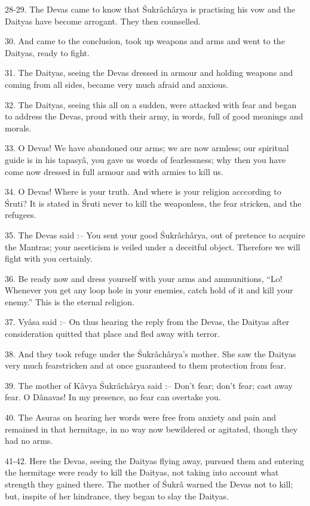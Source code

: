 28-29. The Devas came to know that \'Sukr\^ach\^arya is practising his vow and the Daityas have become arrogant. They then counselled.

30. And came to the conclusion, took up weapons and arms and went to the Daityas, ready to fight.

31. The Daityas, seeing the Devas dressed in armour and holding weapons and coming from all sides, became very much afraid and anxious.

32. The Daityas, seeing this all on a sudden, were attacked with fear and began to address the Devas, proud with their army, in words, full of good meanings and morals.

33. O Devas! We have abandoned our arms; we are now armless; our spiritual guide is in his tapasy\^a, you gave us words of fearlessness; why then you have come now dressed in full armour and with armies to kill us.

34. O Devas! Where is your truth. And where is your religion acccording to \'Sruti? It is stated in \'Sruti never to kill the weaponless, the fear stricken, and the refugees.

35. The Devas said :-- You sent your good \'Sukr\^ach\^arya, out of pretence to acquire the Mantras; your asceticism is veiled under a deceitful object. Therefore we will fight with you certainly.

36. Be ready now and dress yourself with your arms and ammunitions, ``Lo! Whenever you get any loop hole in your enemies, catch hold of it and kill your enemy.'' This is the eternal religion.

37. Vy\^asa said :-- On thus hearing the reply from the Devas, the Daityas after consideration quitted that place and fled away with terror.

38. And they took refuge under the \'Sukr\^ach\^arya's mother. She saw the Daityas very much fearstricken and at once guaranteed to them protection from fear.

39. The mother of K\^avya \'Sukr\^ach\^arya said :-- Don't fear; don't fear; cast away fear. O D\^anavas! In my presence, no fear can overtake you.

40. The Asuras on hearing her words were free from anxiety and pain and remained in that hermitage, in no way now bewildered or agitated, though they had no arms.

41-42. Here the Devas, seeing the Daityas flying away, pursued them and entering the hermitage were ready to kill the Daityas, not taking into account what strength they gained there. The mother of \'Sukr\^a warned the Devas not to kill; but, inspite of her hindrance, they began to slay the Daityas.

